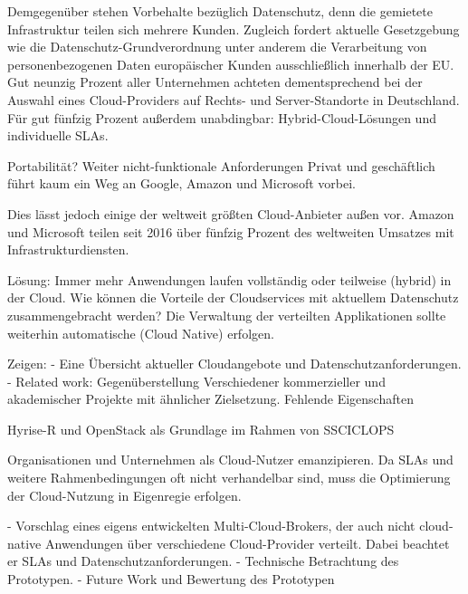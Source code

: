 Demgegenüber stehen Vorbehalte bezüglich Datenschutz, denn die gemietete Infrastruktur teilen sich mehrere Kunden. Zugleich fordert aktuelle Gesetzgebung wie die Datenschutz-Grundverordnung unter anderem die Verarbeitung von personenbezogenen Daten europäischer Kunden ausschließlich innerhalb der EU. %
Gut neunzig Prozent aller Unternehmen achteten dementsprechend bei der Auswahl eines Cloud-Providers auf Rechts- und Server-Standorte in Deutschland. Für gut fünfzig Prozent außerdem unabdingbar: Hybrid-Cloud-Lösungen und individuelle SLAs.

Portabilität? Weiter nicht-funktionale Anforderungen
Privat und geschäftlich führt kaum ein Weg an Google, Amazon und Microsoft vorbei. 


Dies lässt jedoch einige der weltweit größten Cloud-Anbieter außen vor. Amazon und Microsoft teilen seit 2016 über fünfzig Prozent des weltweiten Umsatzes mit Infrastrukturdiensten. %

Lösung: Immer mehr Anwendungen laufen vollständig oder teilweise (hybrid) in der Cloud. Wie können die Vorteile der Cloudservices mit aktuellem Datenschutz zusammengebracht werden? Die Verwaltung der verteilten Applikationen sollte weiterhin automatische (Cloud Native) erfolgen.

Zeigen: 
- Eine Übersicht aktueller Cloudangebote und Datenschutzanforderungen.
- Related work: Gegenüberstellung Verschiedener kommerzieller und akademischer Projekte mit ähnlicher Zielsetzung. Fehlende Eigenschaften

Hyrise-R und OpenStack als Grundlage im Rahmen von SSCICLOPS

Organisationen und Unternehmen als Cloud-Nutzer emanzipieren. Da SLAs und weitere Rahmenbedingungen oft nicht verhandelbar sind, muss die Optimierung der Cloud-Nutzung in Eigenregie erfolgen.

- Vorschlag eines eigens entwickelten Multi-Cloud-Brokers, der auch nicht cloud-native Anwendungen über verschiedene Cloud-Provider verteilt. Dabei beachtet er SLAs und Datenschutzanforderungen.
- Technische Betrachtung des Prototypen.
- Future Work und Bewertung des Prototypen